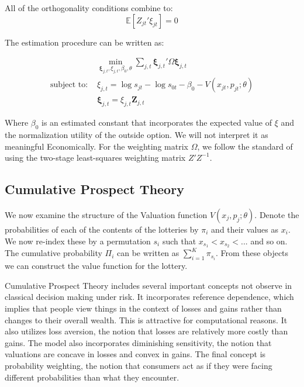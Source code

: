\documentclass[12pt]{paper}
\newcommand{\inv}[1]{{#1}^{-1}}
\newcommand{\exV}[1]{\mathbb{E} \left [ #1 \right ]}
\begin{document}
All of the orthogonality conditions combine to:
\begin{equation*}
  \exV{Z_{jt}'\xi_{jt}} = 0
\end{equation*}

The estimation procedure can be written as:

\begin{align}
  &\min_{\bm{\xi}_{j,t}, \xi_{j,t}, \beta_0, \theta} \sum_{j,t}\bm{\xi}_{j,t}' \Omega \bm{\xi}_{j,t}\\
  \text{subject to: } &\xi_{j,t} = \log s_{jt} - \log s_{0t} - \beta_0
                        - V( x_{jt}, p_{jt}; \theta)\\
  &\bm{\xi}_{j,t} = \xi_{j,t} \bm{Z}_{j,t}  
\end{align}

Where $\beta_0$ is an estimated constant that incorporates the expected
value of $\xi$ and the normalization utility of the outside option. We
will not interpret it as meaningful Economically. For the weighting
matrix $\Omega$, we follow the standard of using the two-stage
least-squares weighting matrix $\inv{Z'Z}$. 



\subsection{Cumulative Prospect Theory}


We now examine the structure of the Valuation function $V( x_j,
p_j; \theta)$. Denote the probabilities of each of the contents of the
lotteries by $\pi_i$ and their values as $x_i$. We now re-index these by
a permutation $s_i$ such that $x_{s_1} < x_{s_2} < ...$ and so on. The
cumulative probability $\Pi_i$ can be written as $\sum_{i=1}^K
\pi_{s_i}$. From these objects we can construct the value function for
the lottery.

Cumulative Prospect Theory includes several important concepts not
observe in classical decision making under risk. It incorporates
reference dependence, which implies that people view things in the
context of losses and gains rather than changes to their overall
wealth. This is attractive for computational reasons. It also utilizes
loss aversion, the notion that losses are relatively more costly than
gains. The model also incorporates diminishing sensitivity, the notion
that valuations are concave in losses and convex in gains. The final
concept is probability weighting, the notion that consumers act as if
they were facing different probabilities than what they encounter.
\end{document}
